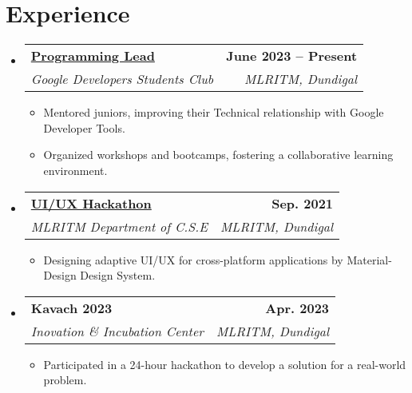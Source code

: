 \documentclass[a4paper,11pt]{article}
\makeatletter
\newcommand{\resumeItem}[1]{
  \item\small{
    {#1 \vspace{-2pt}}
  }
}
\newcommand{\resumeSubheading}[4]{
  \vspace{-2pt}\item
    \begin{tabular*}{0.97\textwidth}[t]{l@{\extracolsep{\fill}}r}
      \textbf{#1} & \textbf{\small #2} \\
      \textit{\small#3} & \textit{\small #4} \\
    \end{tabular*}\vspace{-7pt}
}
\newcommand{\resumeSubSubheading}[2]{
    \item
    \begin{tabular*}{0.97\textwidth}{l@{\extracolsep{\fill}}r}
      \textit{\small#1} & \textit{\small #2} \\
    \end{tabular*}\vspace{-7pt}
}
\newcommand{\resumeSubHeadingListStart}{\begin{itemize}[leftmargin=0.15in, label={}]}
\newcommand{\resumeSubHeadingListEnd}{\end{itemize}}
\newcommand{\resumeItemListStart}{\begin{itemize}}
\newcommand{\resumeItemListEnd}{\end{itemize}\vspace{-5pt}}
\makeatother
\begin{document}
    
\section{Experience}
  \resumeSubHeadingListStart
    \resumeSubheading
      {\href{https://g.dev/tsrinu2003}{Programming Lead}}{June 2023 -- Present}
      {Google Developers Students Club}{MLRITM, Dundigal}
      \resumeItemListStart
        \resumeItem{Mentored juniors, improving their Technical relationship with Google Developer Tools.}
        \resumeItem{Organized workshops and bootcamps, fostering a collaborative learning environment.}
      \resumeItemListEnd
      

    \resumeSubheading
    {\href{https://drive.google.com/file/d/1Hg6w58KnwbqaRiJdtpxpFh-dshw1vEoR/view?usp=sharing}{UI/UX Hackathon}}{Sep. 2021}
    {MLRITM Department of C.S.E}{MLRITM, Dundigal}
      \resumeItemListStart
        \resumeItem{Designing adaptive UI/UX for cross-platform applications by Material-Design Design System.}
    \resumeItemListEnd

    \resumeSubheading{Kavach 2023}{Apr. 2023}{Inovation \& Incubation Center}{MLRITM, Dundigal}
      \resumeItemListStart
          \resumeItem{Participated in a 24-hour hackathon to develop a solution for a real-world problem.}
      \resumeItemListEnd
  \resumeSubHeadingListEnd

\end{document}
